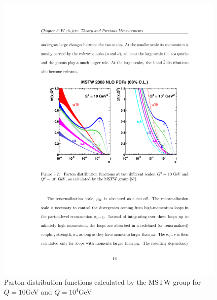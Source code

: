 \begin{figure}[htbp]
	\centering
		\includegraphics{Figures/MSTW.pdf}
	\caption[Parton distribution functions for different momentum transfers]{Parton distribution functions calculated by the MSTW group for $Q=10$GeV and $Q=10^4$GeV \citep{Martin:2009iq}}
	\label{fig:MSTW}
\end{figure}

